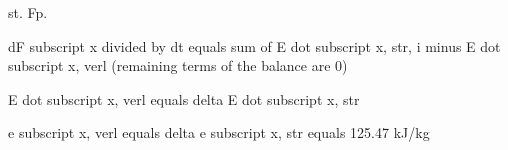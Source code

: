 st. Fp.

dF subscript x divided by dt equals sum of E dot subscript x, str, i minus E dot subscript x, verl (remaining terms of the balance are 0)

E dot subscript x, verl equals delta E dot subscript x, str

e subscript x, verl equals delta e subscript x, str equals 125.47 kJ/kg